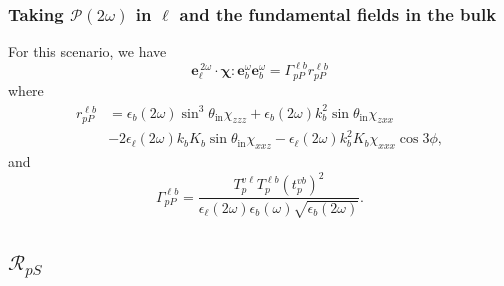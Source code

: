 \documentclass[10pt]{article}
\begin{document}
\subsubsection{Taking \texorpdfstring{$\mathcal{P}(2\omega)$}{P(2w)} in
\texorpdfstring{$\ell$}{l} and the fundamental fields in the bulk}

For this scenario, we have
\begin{equation*}
\mathbf{e}^{\,2\omega}_{\ell}\cdot
\boldsymbol{\chi}:\mathbf{e}^{\omega}_{b}\mathbf{e}^{\omega}_{b} =
\Gamma^{\ell b}_{pP}r^{\ell b}_{pP}
\end{equation*}
where
\begin{equation*}
\begin{split}
r^{\ell b}_{pP} &= 
  \epsilon_{b}(2\omega)\sin^{3}\theta_{\mathrm{in}}\chi_{zzz}
+ \epsilon_{b}(2\omega)k^{2}_{b}\sin\theta_{\mathrm{in}}\chi_{zxx}\\
&- 2\epsilon_{\ell}(2\omega)k_{b}K_{b}\sin\theta_{\mathrm{in}}\chi_{xxz}
- \epsilon_{\ell}(2\omega)k^{2}_{b}K_{b}\chi_{xxx}\cos3\phi,
\end{split}
\end{equation*}
and
\begin{equation*}
\Gamma^{\ell b}_{pP}=
\frac{T^{v\ell}_{p}T^{\ell b}_{p}\left(t^{vb}_{p}\right)^{2}}
  {\epsilon_{\ell}({2\omega})\epsilon_{b}(\omega)\sqrt{\epsilon_{b}(2\omega)}}.
\end{equation*}

\subsection{\texorpdfstring{$\mathcal{R}_{pS}$}{RpS}}
\end{document}
